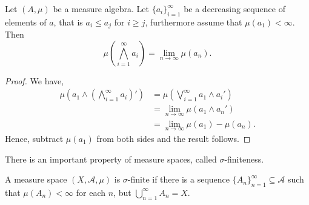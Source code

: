 \documentclass{owmaths}
\begin{document}
\begin{proposition}
    Let $(A,\mu)$ be a measure algebra. Let $\{a_i\}_{i=1}^\infty$ be a decreasing
    sequence of elements of $a$, that is $a_i \leq a_j$ for $i \geq j$, furthermore
    assume that $\mu(a_1) < \infty$. Then
    \begin{equation*}
        \mu\left(\bigwedge_{i=1}^\infty a_i\right) = \lim_{n\rightarrow\infty} \mu(a_n).
    \end{equation*}
\end{proposition}
\begin{proof}
    We have,
    \begin{align*}
        \mu\left(a_1\wedge \left(\bigwedge_{i=1}^\infty a_i\right)'\right) &= \mu\left(\bigvee_{i=1}^\infty a_1\wedge a_i' \right)\\
        &= \lim_{n\rightarrow\infty}  \mu(a_1\wedge a_n')\\
        &= \lim_{n\rightarrow\infty} \mu(a_1)-\mu(a_n).
    \end{align*}
    Hence, subtract $\mu(a_1)$ from both sides and the result follows.
\end{proof}

There is an important property of measure spaces, called $\sigma$-finiteness.
\begin{definition}
    A measure space $(X,\mathcal{A},\mu)$ is $\sigma$-finite if there is
    a sequence $\{A_n\}_{n=1}^\infty \subseteq \mathcal{A}$ such
    that $\mu(A_n) < \infty$ for each $n$, but $\bigcup_{n=1}^\infty A_n = X$.
\end{definition}
\end{document}

